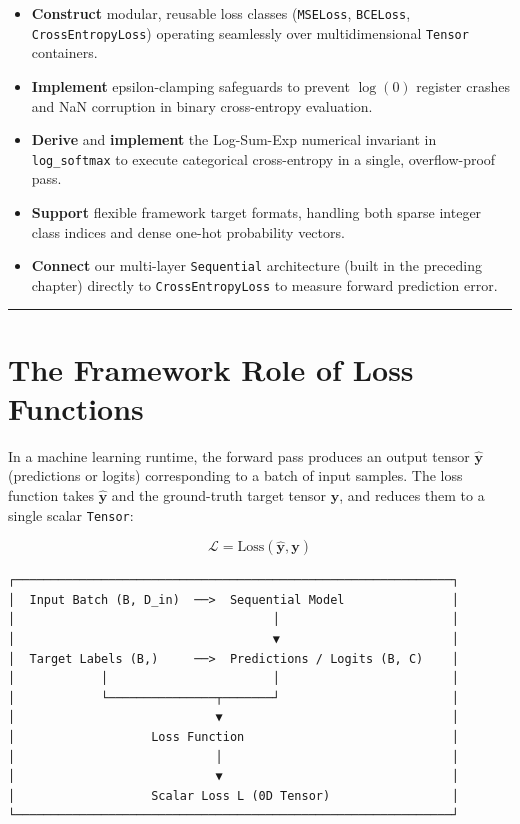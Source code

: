 \documentclass[
  letterpaper,
]{scrbook}
\providecommand{\tightlist}{%
  \setlength{\itemsep}{0pt}\setlength{\parskip}{0pt}}
\begin{document}
\begin{itemize}
\tightlist
\item
  \textbf{Construct} modular, reusable loss classes (\texttt{MSELoss},
  \texttt{BCELoss}, \texttt{CrossEntropyLoss}) operating seamlessly over
  multidimensional \texttt{Tensor} containers.
\item
  \textbf{Implement} epsilon-clamping safeguards to prevent \(\log(0)\)
  register crashes and NaN corruption in binary cross-entropy
  evaluation.
\item
  \textbf{Derive} and \textbf{implement} the Log-Sum-Exp numerical
  invariant in \texttt{log\_softmax} to execute categorical
  cross-entropy in a single, overflow-proof pass.
\item
  \textbf{Support} flexible framework target formats, handling both
  sparse integer class indices and dense one-hot probability vectors.
\item
  \textbf{Connect} our multi-layer \texttt{Sequential} architecture
  (built in the preceding chapter) directly to \texttt{CrossEntropyLoss}
  to measure forward prediction error.
\end{itemize}

\begin{center}\rule{0.5\linewidth}{0.5pt}\end{center}

\section{The Framework Role of Loss
Functions}\label{the-framework-role-of-loss-functions}

In a machine learning runtime, the forward pass produces an output
tensor \(\hat{\mathbf{y}}\) (predictions or logits) corresponding to a
batch of input samples. The loss function takes \(\hat{\mathbf{y}}\) and
the ground-truth target tensor \(\mathbf{y}\), and reduces them to a
single scalar \texttt{Tensor}:

\[\mathcal{L} = \text{Loss}(\hat{\mathbf{y}}, \mathbf{y})\]

\begin{verbatim}
┌─────────────────────────────────────────────────────────────┐
│  Input Batch (B, D_in)  ──>  Sequential Model               │
│                                    │                        │
│                                    ▼                        │
│  Target Labels (B,)     ──>  Predictions / Logits (B, C)    │
│            │                       │                        │
│            └───────────────┬───────┘                        │
│                            ▼                                │
│                   Loss Function                             │
│                            │                                │
│                            ▼                                │
│                   Scalar Loss L (0D Tensor)                 │
└─────────────────────────────────────────────────────────────┘
\end{verbatim}
\end{document}
